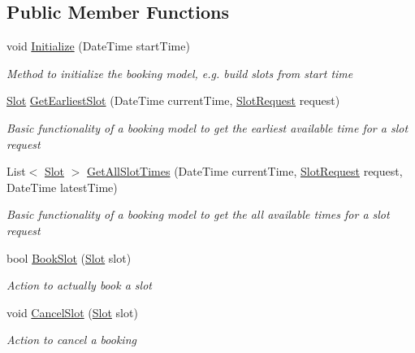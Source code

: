 \subsection*{Public Member Functions}
\begin{DoxyCompactItemize}
\item 
void \hyperlink{interface_general_health_care_elements_1_1_booking_models_1_1_i_booking_model_aa8b737bc34bf3beaa06e72baee657ee1}{Initialize} (Date\+Time start\+Time)
\begin{DoxyCompactList}\small\item\em Method to initialize the booking model, e.\+g. build slots from start time \end{DoxyCompactList}\item 
\hyperlink{class_general_health_care_elements_1_1_booking_models_1_1_slot}{Slot} \hyperlink{interface_general_health_care_elements_1_1_booking_models_1_1_i_booking_model_a20e5be49a07b0625453d664dcb7cdd94}{Get\+Earliest\+Slot} (Date\+Time current\+Time, \hyperlink{class_general_health_care_elements_1_1_booking_models_1_1_slot_request}{Slot\+Request} request)
\begin{DoxyCompactList}\small\item\em Basic functionality of a booking model to get the earliest available time for a slot request \end{DoxyCompactList}\item 
List$<$ \hyperlink{class_general_health_care_elements_1_1_booking_models_1_1_slot}{Slot} $>$ \hyperlink{interface_general_health_care_elements_1_1_booking_models_1_1_i_booking_model_abbd61fc6c21ab3e2ecc8a658cfc2166f}{Get\+All\+Slot\+Times} (Date\+Time current\+Time, \hyperlink{class_general_health_care_elements_1_1_booking_models_1_1_slot_request}{Slot\+Request} request, Date\+Time latest\+Time)
\begin{DoxyCompactList}\small\item\em Basic functionality of a booking model to get the all available times for a slot request \end{DoxyCompactList}\item 
bool \hyperlink{interface_general_health_care_elements_1_1_booking_models_1_1_i_booking_model_a508f92cce26084f400d1b706f45d1fdb}{Book\+Slot} (\hyperlink{class_general_health_care_elements_1_1_booking_models_1_1_slot}{Slot} slot)
\begin{DoxyCompactList}\small\item\em Action to actually book a slot \end{DoxyCompactList}\item 
void \hyperlink{interface_general_health_care_elements_1_1_booking_models_1_1_i_booking_model_a95a7ef8be5a6a69d8cf21fa93d450861}{Cancel\+Slot} (\hyperlink{class_general_health_care_elements_1_1_booking_models_1_1_slot}{Slot} slot)
\begin{DoxyCompactList}\small\item\em Action to cancel a booking \end{DoxyCompactList}\end{DoxyCompactItemize}


